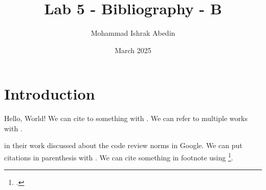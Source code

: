 \documentclass{article}
\title{Lab 5 - Bibliography - B}
\author{Mohammad Ishrak Abedin}
\date{March 2025}
\begin{document}
\maketitle

\tableofcontents

\section{Introduction}
Hello, World! We can cite to something with \cite{norman2013design}. We can refer to multiple works with \cite{rowling2015deathlyhollows, sadowski2018moderncodereview, wiki2025latex}.

\textcite{sadowski2018moderncodereview} in their work discussed about the code review norms in Google. We can put citations in parenthesis with \parencite{rowling2015deathlyhollows}. We can cite something in footnote using \footcite{wiki2025latex}.

\printbibliography[heading=bibintoc, title={Bibliography}]

% 
% 
\end{document}

